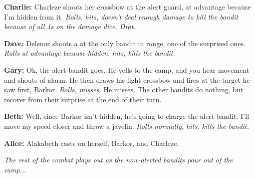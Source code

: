 \textbf{Charlie:} Charleze shoots her crossbow at the alert guard, at advantage because I'm hidden from it. \textit{Rolls, hits, doesn't deal enough damage to kill the bandit because of all 1s on the damage dice. Drat.}

\textbf{Dave:} Delenor shoots a  at the only bandit in range, one of the surprised ones. \textit{Rolls at advantage because hidden, hits, kills the bandit.}

\textbf{Gary:} Ok, the alert bandit goes. He yells to the camp, and you hear movement and shouts of alarm. He then draws his light crossbow and fires at the target he saw first, Barkor. \textit{Rolls, misses.} He misses. The other bandits do nothing, but recover from their surprise at the end of their turn.

\textbf{Beth:} Well, since Barkor isn't hidden, he's going to charge the alert bandit. I'll move my speed closer and throw a javelin. \textit{Rolls normally, hits, kills the bandit.}

\textbf{Alice:} Alakabeth casts  on herself, Barkor, and Charleze.

\textit{The rest of the combat plays out as the now-alerted bandits pour out of the camp...}